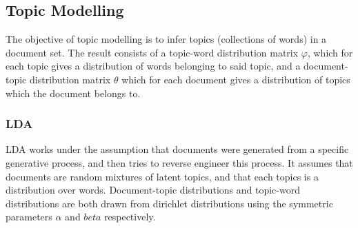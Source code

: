 \subsection{Topic Modelling}\label{subsec:topicModelling}
The objective of topic modelling is to infer topics (collections of words) in a document set.
The result consists of a topic-word distribution matrix $\varphi$, which for each topic gives a distribution of words belonging to said topic, and a document-topic distribution matrix $\theta$ which for each document gives a distribution of topics which the document belongs to.

\subsubsection{\acrlong{LDA}}\label{subsec:lda}
\gls{LDA} works under the assumption that documents were generated from a specific generative process, and then tries to reverse engineer this process. It assumes that documents are random mixtures of latent topics, and that each topics is a distribution over words.
Document-topic distributions and topic-word distributions are both drawn from dirichlet distributions using the symmetric parameters $\alpha$ and $beta$ respectively.